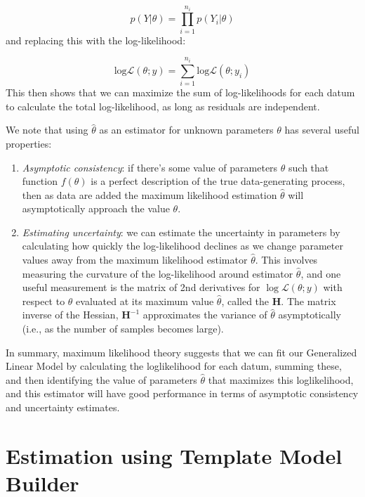\begin{equation}
    p(Y \vert \theta) = \prod_{i=1}^{n_i} p(Y_i \vert \theta)
\end{equation}
and replacing this with the log-likelihood:

\begin{equation}
    \mathrm{log} \mathcal{L}( \theta; y )  = \sum_{i=1}^{n_i} \mathrm{log} \mathcal{L}( \theta; y_i )
\end{equation}
This then shows that we can maximize the sum of log-likelihoods for each datum to calculate the total log-likelihood, as long as residuals are independent. 

We note that using \( \hat{\theta} \) as an estimator for unknown parameters \( \theta \) has several useful properties:

\begin{enumerate}
    \item \textit{Asymptotic consistency}:  if there's some value of parameters \( \theta \) such that function \( f( \theta) \) is a perfect description of the true data-generating process, then as data are added the maximum likelihood estimation \( \hat{\theta} \) will asymptotically approach the value \( \theta \).  

    \item \textit{Estimating uncertainty}:  we can estimate the uncertainty in parameters by calculating how quickly the log-likelihood declines as we change parameter values away from the maximum likelihood estimator \(\hat \theta\).  This involves measuring the curvature of the log-likelihood around estimator \( \hat{\theta} \), and one useful measurement is the matrix of 2nd derivatives for \( \log \mathcal{L}( \theta; y ) \)  with respect to \( \theta \) evaluated at its maximum value \(\hat \theta\), called the  \( \mathbf{H} \).  The matrix inverse of the Hessian, \( \mathbf{H}^{-1} \) approximates the variance of \( \hat{\theta} \) asymptotically (i.e., as the number of samples becomes large).
\end{enumerate}
In summary, maximum likelihood theory suggests that we can fit our Generalized Linear Model by calculating the loglikelihood for each datum, summing these, and then identifying the value of parameters \( \hat{\theta} \) that maximizes this loglikelihood, and this estimator will have good performance in terms of asymptotic consistency and uncertainty estimates.

\section{Estimation using Template Model Builder}

